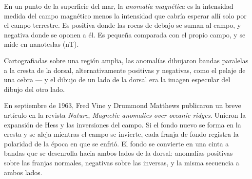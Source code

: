 \begin{definition}\label{def:g11:drift-to-spreading:anomaly}
En un punto de la superficie del mar, la
\emph{anomalía magnética} es la intensidad medida del campo magnético menos la intensidad
que cabría esperar allí solo por el campo terrestre. Es positiva donde las
rocas de debajo se suman al campo, y negativa donde se oponen a él. Es pequeña
comparada con el propio campo, y se mide en nanoteslas (\unit{nT}).
\end{definition}

Cartografiadas sobre una región amplia, las anomalías dibujaron bandas
paralelas a la cresta de la dorsal, alternativamente positivas y negativas,
como el pelaje de una cebra --- y el dibujo de un lado de la dorsal era la
imagen especular del dibujo del otro lado.

\begin{history}
En septiembre de 1963, Fred Vine y Drummond Matthews publicaron un breve artículo en la revista \emph{Nature},
\emph{Magnetic anomalies over oceanic ridges}. Unieron la expansión de Hess y
las inversiones del campo. Si el fondo nuevo se forma en la cresta y se aleja
mientras el campo se invierte, cada franja de fondo registra la polaridad de
la época en que se enfrió. El fondo se convierte en una cinta a bandas que se
desenrolla hacia ambos lados de la dorsal: anomalías positivas sobre las
franjas normales, negativas sobre las inversas, y la misma secuencia a ambos
lados.
\end{history}

